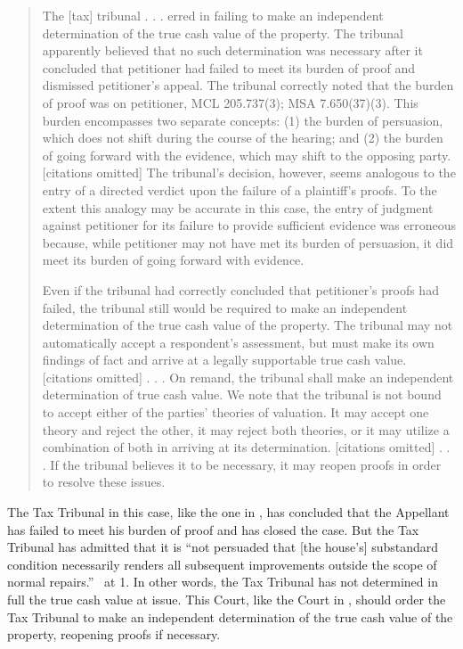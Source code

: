 \documentclass[12pt,\documentclassflag]{michiganCourtOfAppealsBrief}
\begin{document}
\begin{quote}
The [tax] tribunal . . . erred in failing to make an independent determination of the true cash value of the property. The tribunal apparently believed that no such determination was necessary after it concluded that petitioner had failed to meet its burden of proof and dismissed petitioner's appeal. The tribunal correctly noted that the burden of proof was on petitioner, MCL 205.737(3); MSA 7.650(37)(3). This burden encompasses two separate concepts: (1) the burden of persuasion, which does not shift during the course of the hearing; and (2) the burden of going forward with the evidence, which may shift to the opposing party. [citations omitted] The tribunal's decision, however, seems analogous to the entry of a directed verdict upon the failure of a plaintiff's proofs. To the extent this analogy may be accurate in this case, the entry of judgment against petitioner for its failure to provide sufficient evidence was erroneous because, while petitioner may not have met its burden of persuasion, it did meet its burden of going forward with evidence.

  Even if the tribunal had correctly concluded that petitioner's proofs had failed, the tribunal still would be required to make an independent determination of the true cash value of the property. The tribunal may not automatically accept a respondent's assessment, but must make its own findings of fact and arrive at a legally supportable true cash value. [citations omitted] . . . On remand, the tribunal shall make an independent determination of true cash value. We note that the tribunal is not bound to accept either of the parties' theories of valuation. It may accept one theory and reject the other, it may reject both theories, or it may utilize a combination of both in arriving at its determination. [citations omitted] . . . If the tribunal believes it to be necessary, it may reopen proofs in order to resolve these issues.
\end{quote}

The Tax Tribunal in this case, like the one in \cite[s]{Jones & Laughlin}, has concluded that the Appellant has failed to meet his burden of proof and has closed the case.  But the Tax Tribunal has admitted that it is ``not persuaded that [the house's] substandard condition necessarily renders all subsequent improvements outside the scope of normal repairs.'' \FOJ\ at 1. In other words, the Tax Tribunal has not determined in full the true cash value at issue. This Court, like the Court in \cite[s]{Jones & Laughlin}, should order the Tax Tribunal to make an independent determination of the true cash value of the property, reopening proofs if necessary.
\end{document}
